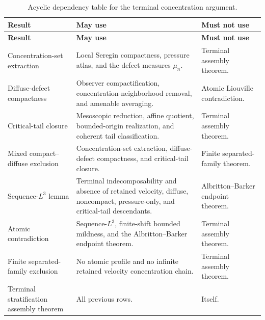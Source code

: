 \documentclass[11pt]{amsart}
\numberwithin{equation}{section}
\theoremstyle{plain}
\theoremstyle{definition}
\theoremstyle{remark}
\begin{document}
\begin{longtable}{@{}L{0.27\textwidth}L{0.43\textwidth}L{0.22\textwidth}@{}}
\caption{Acyclic dependency table for the terminal concentration argument.}
\label{tab:terminal-dependency-table}\\
\hline
\textbf{Result} & \textbf{May use} & \textbf{Must not use}\\
\hline
\endfirsthead
\hline
\textbf{Result} & \textbf{May use} & \textbf{Must not use}\\
\hline
\endhead
\hline
\endfoot
Concentration-set extraction &
Local Seregin compactness, pressure atlas, and the defect measures \(\mu_n\). &
Terminal assembly theorem.\\
Diffuse-defect compactness &
Observer compactification, concentration-neighborhood removal, and amenable
averaging. &
Atomic Liouville contradiction.\\
Critical-tail closure &
Mesoscopic reduction, affine quotient, bounded-origin realization, and coherent
tail classification. &
Terminal assembly theorem.\\
Mixed compact--diffuse exclusion &
Concentration-set extraction, diffuse-defect compactness, and critical-tail
closure. &
Finite separated-family theorem.\\
Sequence-\(L^3\) lemma &
Terminal indecomposability and absence of retained velocity, diffuse,
noncompact, pressure-only, and critical-tail descendants. &
Albritton--Barker endpoint theorem.\\
Atomic contradiction &
Sequence-\(L^3\), finite-shift bounded mildness, and the Albritton--Barker
endpoint theorem. &
Terminal assembly theorem.\\
Finite separated-family exclusion &
No atomic profile and no infinite retained velocity concentration chain. &
Terminal assembly theorem.\\
Terminal stratification assembly theorem &
All previous rows. &
Itself.\\
\hline
\end{longtable}
\end{document}

